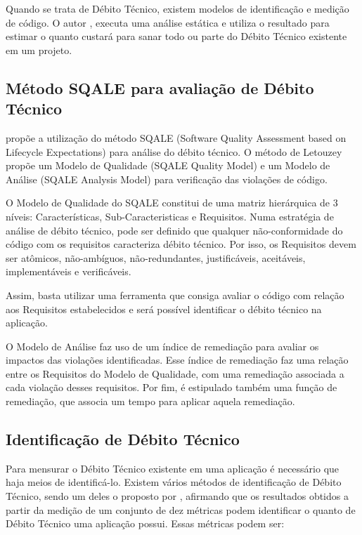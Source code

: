 Quando se trata de Débito Técnico, existem modelos de identificação e medição de
código. O autor \cite{eisenberg}, executa uma análise estática e utiliza o
resultado para estimar o quanto custará para sanar todo ou parte do Débito
Técnico existente em um projeto.



\subsection{Método SQALE para avaliação de Débito Técnico}
\cite{letouzey} propõe a utilização do método SQALE (Software Quality Assessment
based on Lifecycle Expectations) para análise do débito técnico. O método de
Letouzey propõe um Modelo de Qualidade (SQALE Quality Model) e um Modelo de
Análise (SQALE Analysis Model) para verificação das violações de código.

O Modelo de Qualidade do SQALE constitui de uma matriz hierárquica de 3 níveis:
Características, Sub-Caracteristicas e Requisitos. Numa estratégia de análise de
débito técnico, pode ser definido que qualquer não-conformidade do código com os
requisitos caracteriza débito técnico. Por isso, os Requisitos devem ser atômicos,
não-ambíguos, não-redundantes, justificáveis, aceitáveis, implementáveis e
verificáveis.

Assim, basta utilizar uma ferramenta que consiga avaliar o código com relação
aos Requisitos estabelecidos e será possível identificar o débito técnico na
aplicação.

O Modelo de Análise faz uso de um índice de remediação para avaliar os
impactos das violações identificadas. Esse índice de remediação faz uma relação
entre os Requisitos do Modelo de Qualidade, com uma remediação associada a
cada violação desses requisitos. Por fim, é estipulado também uma função de
remediação, que associa um tempo para aplicar aquela remediação.

\subsection{Identificação de Débito Técnico}
Para mensurar o Débito Técnico existente em uma aplicação é necessário que haja
meios de identificá-lo. Existem vários métodos de identificação de Débito Técnico,
sendo um deles o proposto por \cite{siebra}, afirmando que os resultados obtidos a
partir da medição de um conjunto de dez métricas podem identificar o quanto de
Débito Técnico uma aplicação possui. Essas métricas podem ser:

